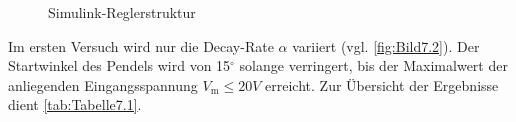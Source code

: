 \begin{figure}[H]
   \centering
   \caption[Simulink-Reglerstruktur]{Simulink-Reglerstruktur}
   \label{fig:Bild7.5}
\end{figure}

Im ersten Versuch wird nur die Decay-Rate $\alpha$ variiert (vgl. \autoref{fig:Bild7.2}). Der Startwinkel des Pendels wird von 15$^\circ$ solange verringert, bis der Maximalwert der anliegenden Eingangsspannung $V_{\mathrm{m}} \leq 20V$ erreicht. Zur Übersicht der Ergebnisse dient \autoref{tab:Tabelle7.1}.

